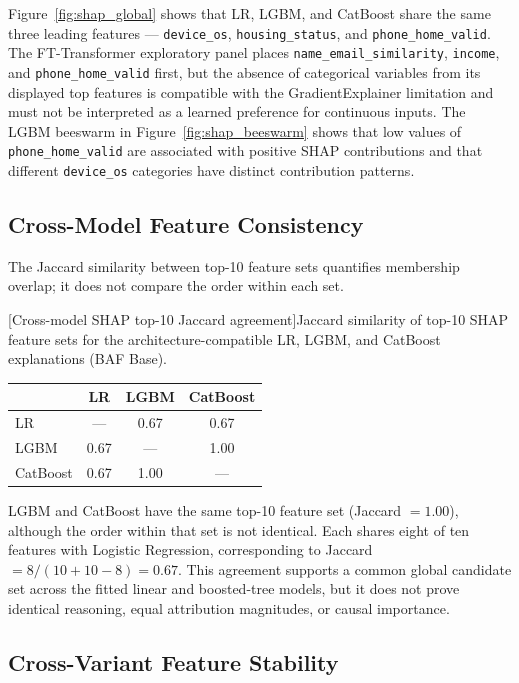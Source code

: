 Figure~\ref{fig:shap_global} shows that LR, LGBM, and CatBoost share the same three leading features --- \texttt{device\_os}, \texttt{housing\_status}, and \texttt{phone\_home\_valid}. The FT-Transformer exploratory panel places \texttt{name\_email\_similarity}, \texttt{income}, and \texttt{phone\_home\_valid} first, but the absence of categorical variables from its displayed top features is compatible with the GradientExplainer limitation and must not be interpreted as a learned preference for continuous inputs. The LGBM beeswarm in Figure~\ref{fig:shap_beeswarm} shows that low values of \texttt{phone\_home\_valid} are associated with positive SHAP contributions and that different \texttt{device\_os} categories have distinct contribution patterns.

\subsection{Cross-Model Feature Consistency}

The Jaccard similarity between top-10 feature sets quantifies membership overlap; it does not compare the order within each set.

\noindent\begin{minipage}{\linewidth}\centering
{}[Cross-model SHAP top-10 Jaccard agreement]{Jaccard similarity of top-10 SHAP feature sets for the architecture-compatible LR, LGBM, and CatBoost explanations (BAF Base).}
\label{tab:shap_consistency}
\begin{tabular}{l c c c}
\toprule
          & LR & LGBM & CatBoost \\
\midrule
LR         & --- & 0.67 & 0.67 \\
LGBM       & 0.67 & --- & 1.00 \\
CatBoost   & 0.67 & 1.00 & --- \\
\bottomrule
\end{tabular}
\end{minipage}

LGBM and CatBoost have the same top-10 feature set (Jaccard $=1.00$), although the order within that set is not identical. Each shares eight of ten features with Logistic Regression, corresponding to Jaccard $=8/(10+10-8)=0.67$. This agreement supports a common global candidate set across the fitted linear and boosted-tree models, but it does not prove identical reasoning, equal attribution magnitudes, or causal importance.

\subsection{Cross-Variant Feature Stability}

